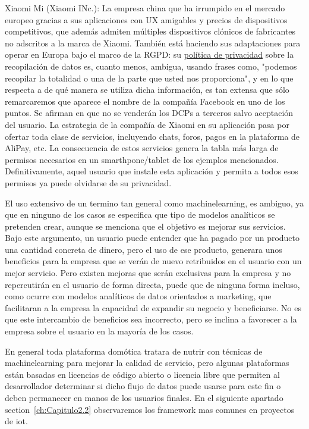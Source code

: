 Xiaomi Mi (Xiaomi INc.): La empresa china que ha irrumpido en el mercado europeo gracias a sus aplicaciones con UX amigables y precios de dispositivos competitivos, que además admiten múltiples dispositivos clónicos de fabricantes no adscritos a la marca de Xiaomi. También está haciendo sus adaptaciones para operar en Europa bajo el marco de la RGPD: su \href{https://www.mi.com/es/about/privacy}{política de privacidad} sobre la recopilación de datos es, cuanto menos, ambigua, usando frases como, "podemos recopilar la totalidad o una de la parte que usted nos proporciona", y en lo que respecta a de qué manera se utiliza dicha información, es tan extensa que sólo remarcaremos que aparece el nombre de la compañía Facebook en uno de los puntos. Se afirman en que no se venderán los DCPs a terceros salvo aceptación del usuario. La estrategia de la compañía de Xiaomi en su aplicación pasa por ofertar toda clase de servicios, incluyendo chats, foros, pagos en la plataforma de AliPay, etc. La consecuencia de estos servicios genera la tabla más larga de permisos necesarios en un smarthpone/tablet de los ejemplos mencionados. Definitivamente, aquel usuario que instale esta aplicación y permita a todos esos permisos ya puede olvidarse de su privacidad.


\vspace{1cm}

El uso extensivo de un termino tan general como \gls{machinelearning}, es ambiguo, ya que en ninguno de los casos se especifica que tipo de modelos analíticos se pretenden crear, aunque se menciona que el objetivo es mejorar sus servicios. Bajo este argumento, un usuario puede entender que ha pagado por un producto una cantidad concreta de dinero, pero el uso de ese producto, generara unos beneficios para la empresa que se verán de nuevo retribuidos en el usuario con un mejor servicio. Pero existen mejoras que serán exclusivas para la empresa y no repercutirán en el usuario de forma directa, puede que de ninguna forma incluso, como ocurre con modelos analíticos de datos orientados a marketing, que facilitaran  a la empresa la capacidad de expandir su negocio y beneficiarse. No es que este intercambio de beneficios sea incorrecto, pero se inclina a favorecer a la empresa sobre el usuario en la mayoría de los casos.

\vspace{1cm}

En general toda plataforma domótica tratara de nutrir con técnicas de \gls{machinelearning} para mejorar la calidad de servicio, pero algunas plataformas están basadas en licencias de código abierto o licencia libre que permiten al desarrollador determinar si dicho flujo de datos puede usarse para este fin o deben permanecer en manos de los usuarios finales. En el siguiente apartado section~\ref{ch:Capitulo2.2} observaremos los \gls{framework} mas comunes en proyectos de \gls{iot}.


